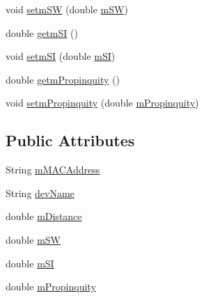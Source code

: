 \begin{DoxyCompactItemize}
\item 
void \hyperlink{classcs_1_1usense_1_1inference_module_1_1_social_interaction_1_1_device_details_a027ca51e71c43912a1a59e3ac59509c4}{setm\+S\+W} (double \hyperlink{classcs_1_1usense_1_1inference_module_1_1_social_interaction_1_1_device_details_a4b17a12a8e1a57eb2eb44683f0832853}{m\+S\+W})
\item 
double \hyperlink{classcs_1_1usense_1_1inference_module_1_1_social_interaction_1_1_device_details_ac6e435a186b0e10d724a3306488a6f29}{getm\+S\+I} ()
\item 
void \hyperlink{classcs_1_1usense_1_1inference_module_1_1_social_interaction_1_1_device_details_afd99f0429f4758defb62c1a3aaec1bf0}{setm\+S\+I} (double \hyperlink{classcs_1_1usense_1_1inference_module_1_1_social_interaction_1_1_device_details_aa68957928663053fdafb3d1c2d4d0d3e}{m\+S\+I})
\item 
double \hyperlink{classcs_1_1usense_1_1inference_module_1_1_social_interaction_1_1_device_details_a6e9bda15357c56608410b8dd23a6e6d5}{getm\+Propinquity} ()
\item 
void \hyperlink{classcs_1_1usense_1_1inference_module_1_1_social_interaction_1_1_device_details_acdf6d8bf908441a80b9407c3aa60a1c0}{setm\+Propinquity} (double \hyperlink{classcs_1_1usense_1_1inference_module_1_1_social_interaction_1_1_device_details_aabf226ca697f761722cf26ed171d8794}{m\+Propinquity})
\end{DoxyCompactItemize}
\subsection*{Public Attributes}
\begin{DoxyCompactItemize}
\item 
String \hyperlink{classcs_1_1usense_1_1inference_module_1_1_social_interaction_1_1_device_details_a3449094768805dda10bcc72250d1ee77}{m\+M\+A\+C\+Address}
\item 
String \hyperlink{classcs_1_1usense_1_1inference_module_1_1_social_interaction_1_1_device_details_a904987ecb833312644ff70e64d3e0342}{dev\+Name}
\item 
double \hyperlink{classcs_1_1usense_1_1inference_module_1_1_social_interaction_1_1_device_details_a8fc5379488cf281823b2cc460d2b0810}{m\+Distance}
\item 
double \hyperlink{classcs_1_1usense_1_1inference_module_1_1_social_interaction_1_1_device_details_a4b17a12a8e1a57eb2eb44683f0832853}{m\+S\+W}
\item 
double \hyperlink{classcs_1_1usense_1_1inference_module_1_1_social_interaction_1_1_device_details_aa68957928663053fdafb3d1c2d4d0d3e}{m\+S\+I}
\item 
double \hyperlink{classcs_1_1usense_1_1inference_module_1_1_social_interaction_1_1_device_details_aabf226ca697f761722cf26ed171d8794}{m\+Propinquity}
\end{DoxyCompactItemize}


